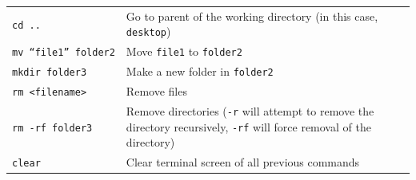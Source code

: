 \documentclass[]{book}
\begin{document}
\begin{longtable}[]{@{}ll@{}}
\begin{minipage}[t]{0.41\columnwidth}
\texttt{cd\ ..}\strut
\end{minipage} & \begin{minipage}[t]{0.53\columnwidth}\raggedright
Go to parent of the working directory (in this case, \texttt{desktop})\strut
\end{minipage}\tabularnewline
\begin{minipage}[t]{0.41\columnwidth}\raggedright
\texttt{mv\ “file1”\ folder2}\strut
\end{minipage} & \begin{minipage}[t]{0.53\columnwidth}\raggedright
Move \texttt{file1} to \texttt{folder2}\strut
\end{minipage}\tabularnewline
\begin{minipage}[t]{0.41\columnwidth}\raggedright
\texttt{mkdir\ folder3}\strut
\end{minipage} & \begin{minipage}[t]{0.53\columnwidth}\raggedright
Make a new folder in \texttt{folder2}\strut
\end{minipage}\tabularnewline
\begin{minipage}[t]{0.41\columnwidth}\raggedright
\texttt{rm\ \textless{}filename\textgreater{}}\strut
\end{minipage} & \begin{minipage}[t]{0.53\columnwidth}\raggedright
Remove files\strut
\end{minipage}\tabularnewline
\begin{minipage}[t]{0.41\columnwidth}\raggedright
\texttt{rm\ -rf\ folder3}\strut
\end{minipage} & \begin{minipage}[t]{0.53\columnwidth}\raggedright
Remove directories (\texttt{-r} will attempt to remove the directory recursively, \texttt{-rf} will force removal of the directory)\strut
\end{minipage}\tabularnewline
\begin{minipage}[t]{0.41\columnwidth}\raggedright
\texttt{clear}\strut
\end{minipage} & \begin{minipage}[t]{0.53\columnwidth}\raggedright
Clear terminal screen of all previous commands\strut
\end{minipage}\tabularnewline
\bottomrule
\end{longtable}
\end{document}
